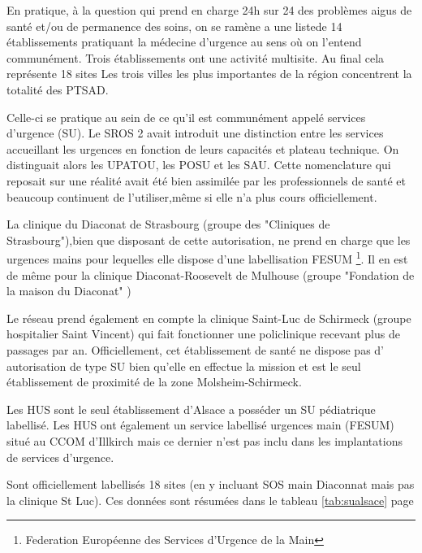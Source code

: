 \documentclass[12pt,english,french,twoside]{report}\usepackage[]{graphicx}\usepackage[]{color}
\begin{document}
En pratique, à la question qui prend en charge 24h sur 24 des problèmes aigus de santé et/ou de permanence des soins, on se ramène a une listede 14 établissements pratiquant la médecine d'urgence au sens où on l'entend communément. Trois établissements ont une activité multisite. Au final cela représente 18 sites Les trois villes les plus importantes de la région concentrent la totalité des PTSAD.

Celle-ci se pratique au sein de ce qu'il est communément appelé services d'urgence (SU). Le SROS 2 avait introduit une distinction entre les services accueillant les urgences en fonction de leurs capacités et plateau technique. On distinguait alors les UPATOU, les POSU et les SAU. Cette nomenclature qui reposait sur une réalité avait été bien assimilée par les professionnels de santé et beaucoup continuent de l'utiliser,même si elle n'a plus cours officiellement. 

La clinique du Diaconat de Strasbourg (groupe des "Cliniques de Strasbourg"),bien que disposant de cette autorisation, ne prend en charge que les urgences mains pour lequelles elle dispose d'une labellisation FESUM \footnote{Federation Européenne des Services d'Urgence de la Main}. Il en est de même pour la clinique Diaconat-Roosevelt de Mulhouse (groupe "Fondation de la maison du Diaconat" )

Le réseau prend également en compte la clinique Saint-Luc de Schirmeck (groupe hospitalier Saint Vincent) qui fait fonctionner une policlinique recevant plus de  passages par an. Officiellement, cet établissement de santé ne dispose pas d' autorisation de type SU bien qu'elle en effectue la mission et est le seul établissement de proximité de la zone Molsheim-Schirmeck.

Les HUS sont le seul établissement d'Alsace a posséder un SU pédiatrique labellisé. Les HUS ont également un service labellisé urgences main (FESUM) situé au CCOM d'Illkirch mais ce dernier n'est pas inclu dans les implantations de services d'urgence.

Sont officiellement labellisés 18 sites (en y incluant SOS main Diaconnat mais pas la clinique St Luc). Ces données sont résumées dans le tableau \ref{tab:sualsace} page \pageref{tab:sualsace}
\end{document}
